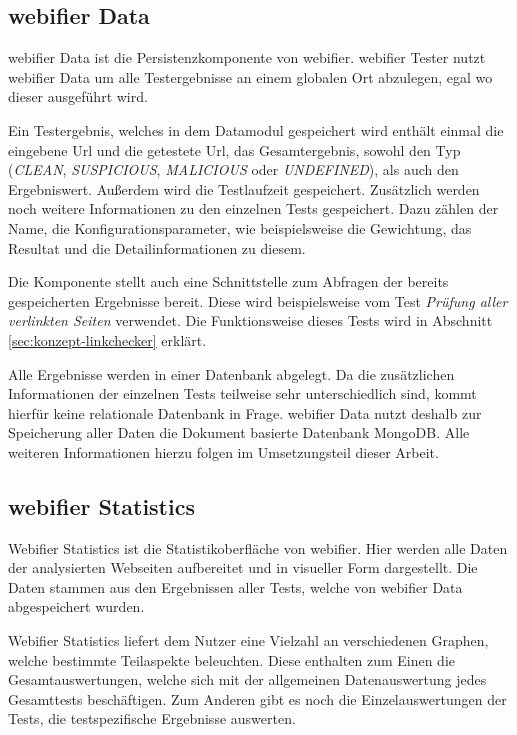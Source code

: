 \subsection{webifier Data}
\label{sec:konzept-data}

webifier Data ist die Persistenzkomponente von webifier. webifier Tester nutzt webifier Data um alle Testergebnisse an einem globalen Ort abzulegen, egal wo dieser ausgeführt wird.

Ein Testergebnis, welches in dem Datamodul gespeichert wird enthält einmal die eingebene Url und die getestete Url, das Gesamtergebnis, sowohl den Typ (\textit{CLEAN}, \textit{SUSPICIOUS}, \textit{MALICIOUS} oder \textit{UNDEFINED}), als auch den Ergebniswert. Außerdem wird die Testlaufzeit gespeichert. Zusätzlich werden noch weitere Informationen zu den einzelnen Tests gespeichert. Dazu zählen der Name, die Konfigurationsparameter, wie beispielsweise die Gewichtung, das Resultat und die Detailinformationen zu diesem.

Die Komponente stellt auch eine Schnittstelle zum Abfragen der bereits gespeicherten Ergebnisse bereit. Diese wird beispielsweise vom Test \textit{Prüfung aller verlinkten Seiten} verwendet. Die Funktionsweise dieses Tests wird in Abschnitt \ref{sec:konzept-linkchecker} erklärt.

Alle Ergebnisse werden in einer Datenbank abgelegt. Da die zusätzlichen Informationen der einzelnen Tests teilweise sehr unterschiedlich sind, kommt hierfür keine relationale Datenbank in Frage. webifier Data nutzt deshalb zur Speicherung aller Daten die Dokument basierte Datenbank MongoDB. Alle weiteren Informationen hierzu folgen im Umsetzungsteil dieser Arbeit.

\subsection{webifier Statistics}
Webifier Statistics ist die Statistikoberfläche von webifier. Hier werden alle Daten der analysierten Webseiten aufbereitet und in visueller Form dargestellt. Die Daten stammen aus den Ergebnissen aller Tests, welche von webifier Data abgespeichert wurden.

Webifier Statistics liefert dem Nutzer eine Vielzahl an verschiedenen Graphen, welche bestimmte Teilaspekte beleuchten. Diese enthalten zum Einen die Gesamtauswertungen, welche sich mit der allgemeinen Datenauswertung jedes Gesamttests beschäftigen. Zum Anderen gibt es noch die Einzelauswertungen der Tests, die testspezifische Ergebnisse auswerten.

